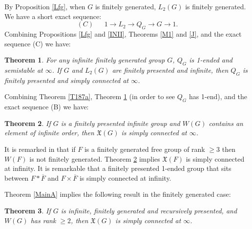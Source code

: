 \documentclass[12pt]{article}
\newtheorem{theorem}{Theorem}[subsection]
\begin{document}
By Proposition \ref{Lfg}, when $G$ is finitely generated, $L_2(G)$ is finitely generated. We have a short exact sequence:
$$(C)\ \ \ \ \ \ \  1\to L_2\to Q_G\to G\to 1.$$
Combining Propositions \ref{Lfg} and \ref{INII}, Theorems \ref{M1} and \ref{J}, and the exact sequence (C) we have:

\begin{theorem}\label{QG1E} 
For any infinite finitely generated group $G$, $Q_G$ is 1-ended and semistable at $\infty$. If $G$ and $L_2(G)$ are finitely presented and infinite, then $Q_G$ is finitely presented and simply connected at $\infty$. 
\end{theorem}

Combining Theorem \ref{T187a}, Theorem \ref{QG1E} (in order to see $Q_G$ has 1-end), and the exact sequence (B) we have:

\begin{theorem}\label{SCISD} 
If $G$ is a finitely presented infinite group and $W(G)$ contains an element of infinite order, then $\mathfrak{X}(G)$ is simply connected at $\infty$. 
\end{theorem}
It is remarked in \cite{BK19} that if $F$ is a finitely generated free group of rank $\geq 3$ then $W(F)$ is not finitely generated. Theorem \ref{SCISD} implies $\mathfrak{X}(F)$ is simply connected at infinity. It is remarkable that a finitely presented 1-ended group that sits between $F\ast \overline F$ and $F\times \overline F$ is simply connected at infinity. 



Theorem \ref{MainA} implies the following result in the finitely generated case:
\begin{theorem}
If $G$ is infinite, finitely generated and recursively presented, and $W(G)$ has rank $\geq 2$, then $\mathfrak{X}(G)$ is simply connected at $\infty$. 
\end{theorem}


\end{document}
